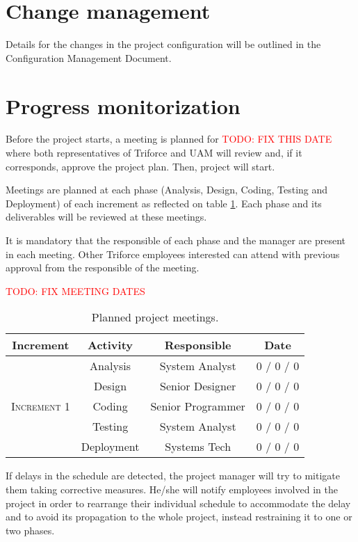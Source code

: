 \section{Change management}

Details for the changes in the project configuration will be outlined in the Configuration Management Document.

\section{Progress monitorization}

Before the project starts, a meeting is planned for \textcolor{red}{TODO: FIX THIS DATE} where both representatives of Triforce and UAM will review and, if it corresponds, approve the project plan. Then, project will start.

Meetings are planned at each phase (Analysis, Design, Coding, Testing and Deployment) of each increment as reflected on table \ref{tblPlannedMeetings}. Each phase and its deliverables will be reviewed at these meetings.

It is mandatory that the responsible of each phase and the manager are present in each meeting. Other Triforce employees interested can attend with previous approval from the responsible of the meeting.

\textcolor{red}{TODO: FIX MEETING DATES}

\begin{table}[hbtp]
\centering
\begin{tabular}{|c|c|c|c|}
\hline
\textbf{Increment} & \textbf{Activity} & \textbf{Responsible} & \textbf{Date} \\ \hline
\multirow{5}{*}{\textsc{Increment 1}} & Analysis & System Analyst & 0 / 0 / 0 \\ \cline{2-4}
 & Design & Senior Designer & 0 / 0 / 0 \\ \cline{2-4}
 & Coding & Senior Programmer & 0 / 0 / 0 \\ \cline{2-4}
 & Testing & System Analyst & 0 / 0 / 0 \\ \cline{2-4}
 & Deployment & Systems Tech & 0 / 0 / 0 \\ \hline
\end{tabular}
\caption{Planned project meetings.}
\label{tblPlannedMeetings}
\end{table}

If delays in the schedule are detected, the project manager will try to mitigate them taking corrective measures. He/she will notify employees involved in the project in order to rearrange their individual schedule to accommodate the delay and to avoid its propagation to the whole project, instead restraining it to one or two phases.

